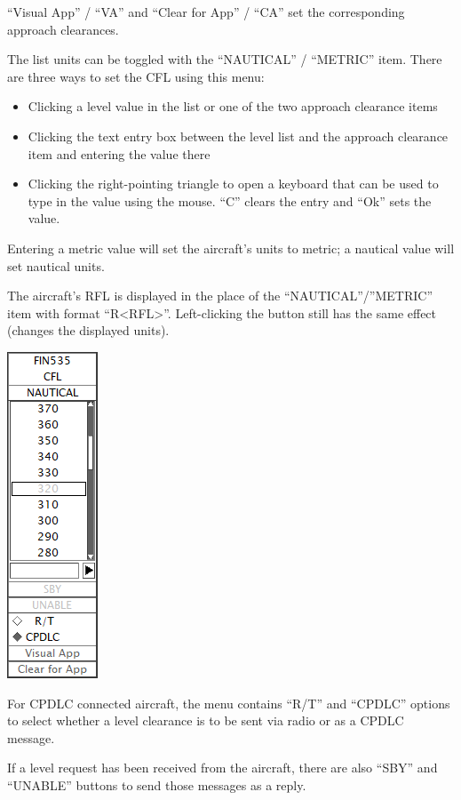 \documentclass[11pt,a4paper]{memoir}
\begin{document}
“Visual App” / “VA” and “Clear for App” / “CA” set the corresponding approach clearances.

The list units can be toggled with the “NAUTICAL” / “METRIC” item. There are three ways to set the CFL using this menu:

\begin{itemize}
        \item Clicking a level value in the list or one of the two approach clearance items
        \item Clicking the text entry box between the level list and the approach clearance item and entering the value there
        \item Clicking the right-pointing triangle to open a keyboard that can be used to type in the value using the mouse. “C” clears the entry and “Ok” sets the value.
\end{itemize}

Entering a metric value will set the aircraft’s units to metric; a nautical value will set nautical units.

The aircraft’s RFL is displayed in the place of the “NAUTICAL”/”METRIC” item with format “R<RFL>”. Left-clicking the button still has the same effect (changes the displayed units).

\includegraphics{img/cfldl.png}

For CPDLC connected aircraft, the menu contains “R/T” and “CPDLC” options to select whether a level clearance is to be sent via radio or as a CPDLC message.

If a level request has been received from the aircraft, there are also “SBY” and “UNABLE” buttons to send those messages as a reply.
\end{document}
